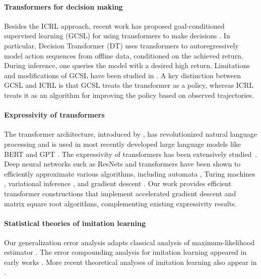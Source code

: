 \documentclass[10pt]{article}
\begin{document}
\paragraph{Transformers for decision making} Besides the ICRL approach, recent work has proposed goal-conditioned supervised learning (GCSL) for using transformers to make decisions \citep{chen2021decision, janner2021offline, lee2022multi, reed2022generalist, brohan2022rt, shafiullah2022behavior, yang2023foundation}. In particular, Decision Transformer (DT) \citep{chen2021decision, janner2021offline} uses transformers to autoregressively model action sequences from offline data, conditioned on the achieved return. During inference, one queries the model with a desired high return. Limitations and modifications of GCSL have been studied in \cite{yang2022dichotomy, paster2022you, vstrupl2022upside, brandfonbrener2022does}. A key distinction between GCSL and ICRL is that GCSL treats the transformer as a policy, whereas ICRL treats it as an algorithm for improving the policy based on observed trajectories. 



\paragraph{Expressivity of transformers} The transformer architecture, introduced by \cite{vaswani2017attention}, has revolutionized natural language processing and is used in most recently developed large language models like BERT and GPT \citep{devlin2018bert, brown2020language}. The expressivity of transformers has been extensively studied~\citep{yun2019transformers, perez2019turing, hron2020infinite,yao2021self, bhattamishra2020computational, zhang2022unveiling, liu2022transformers, wei2022statistically, fu2023can, bai2023transformers, akyurek2022learning, von2023transformers}. Deep neural networks such as ResNets and transformers have been shown to efficiently approximate various algorithms, including automata \citep{liu2022transformers}, Turing machines \citep{wei2022statistically}, variational inference \citep{mei2023deep}, and gradient descent \citep{bai2023transformers, akyurek2022learning, von2023transformers}. Our work provides efficient transformer constructions that implement accelerated gradient descent and matrix square root algorithms, complementing existing expressivity results. 





\paragraph{Statistical theories of imitation learning} Our generalization error analysis adapts classical analysis of maximum-likelihood estimator \citep{geer2000empirical}. The error compounding analysis for imitation learning appeared in early works \citep{ross2011reduction, ross2010efficient}. More recent theoretical analyses of imitation learning also appear in \cite{rajaraman2020toward, rajaraman2021provably, rashidinejad2021bridging}. 
\end{document}

